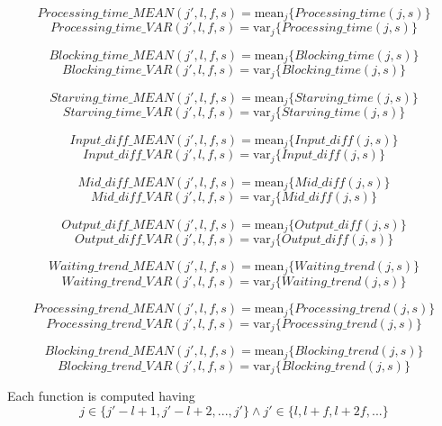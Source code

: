 \[Processing\_time\_MEAN(j',l,f,s)=\text{mean}_j\{Processing\_time(j,s)\}\]
\[Processing\_time\_VAR(j',l,f,s)=\text{var}_j\{Processing\_time(j,s)\}\]

\[Blocking\_time\_MEAN(j',l,f,s)=\text{mean}_j\{Blocking\_time(j,s)\}\]
\[Blocking\_time\_VAR(j',l,f,s)=\text{var}_j\{Blocking\_time(j,s)\}\]

\[Starving\_time\_MEAN(j',l,f,s)=\text{mean}_j\{Starving\_time(j,s)\}\]
\[Starving\_time\_VAR(j',l,f,s)=\text{var}_j\{Starving\_time(j,s)\}\]

\[Input\_diff\_MEAN(j',l,f,s)=\text{mean}_j\{Input\_diff(j,s)\}\]
\[Input\_diff\_VAR(j',l,f,s)=\text{var}_j\{Input\_diff(j,s)\}\]

\[Mid\_diff\_MEAN(j',l,f,s)=\text{mean}_j\{Mid\_diff(j,s)\}\]
\[Mid\_diff\_VAR(j',l,f,s)=\text{var}_j\{Mid\_diff(j,s)\}\]

\[Output\_diff\_MEAN(j',l,f,s)=\text{mean}_j\{Output\_diff(j,s)\}\]
\[Output\_diff\_VAR(j',l,f,s)=\text{var}_j\{Output\_diff(j,s)\}\]

\[Waiting\_trend\_MEAN(j',l,f,s)=\text{mean}_j\{Waiting\_trend(j,s)\}\]
\[Waiting\_trend\_VAR(j',l,f,s)=\text{var}_j\{Waiting\_trend(j,s)\}\]

\[Processing\_trend\_MEAN(j',l,f,s)=\text{mean}_j\{Processing\_trend(j,s)\}\]
\[Processing\_trend\_VAR(j',l,f,s)=\text{var}_j\{Processing\_trend(j,s)\}\]

\[Blocking\_trend\_MEAN(j',l,f,s)=\text{mean}_j\{Blocking\_trend(j,s)\}\]
\[Blocking\_trend\_VAR(j',l,f,s)=\text{var}_j\{Blocking\_trend(j,s)\}\]

Each function is computed having 
\[j\in\{j'-l+1,j'-l+2,...,j'\}\wedge j'\in\{l,l+f,l+2f,...\}\]
